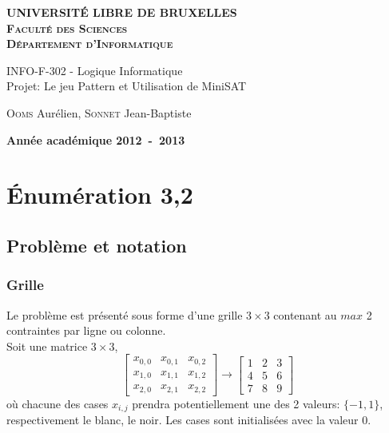 \documentclass[a4paper,12pt]{report}
\begin{document}
\setlength\parindent{0pt} %


\begin{titlepage}
\begin{center}
\textbf{\textsc{UNIVERSIT\'E LIBRE DE BRUXELLES}}\\
\textbf{\textsc{Faculté des Sciences}}\\
\textbf{\textsc{Département d'Informatique}}
\vfill{}\vfill{}
\begin{center}{\Huge INFO-F-302 - Logique Informatique \\Projet: Le jeu Pattern et Utilisation de MiniSAT}\end{center}{\Huge \par}
\begin{center}{\large \textsc{Ooms} Aurélien, \textsc{Sonnet} Jean-Baptiste}\end{center}{\Huge \par}
\vfill{}\vfill{}
\vfill{}\vfill{}\enlargethispage{3cm}
\textbf{Année académique 2012~-~2013}
\end{center}
\end{titlepage}




\tableofcontents
\newpage


\chapter{Énumération 3,2}

\section{Problème et notation}
\subsection{Grille}
Le problème est présenté sous forme d'une grille $3\times3$ contenant au $max$ 2 contraintes par ligne ou colonne.\\

Soit une matrice $3\times3$,  
$$\begin{bmatrix} x_{0,0} & x_{0,1} & x_{0,2} \\ x_{1,0} & x_{1,1} & x_{1,2} \\ x_{2,0} & x_{2,1} & x_{2,2}\end{bmatrix} \rightarrow \begin{bmatrix} 1 & 2 & 3 \\ 4 & 5 & 6 \\ 7 & 8 & 9\end{bmatrix}$$ 
où chacune des cases $x_{i,j}$ prendra potentiellement une des 2 valeurs: 
$\{-1,1\}$, respectivement le blanc, le noir. Les cases sont initialisées avec la valeur $0$.\\
\end{document}
